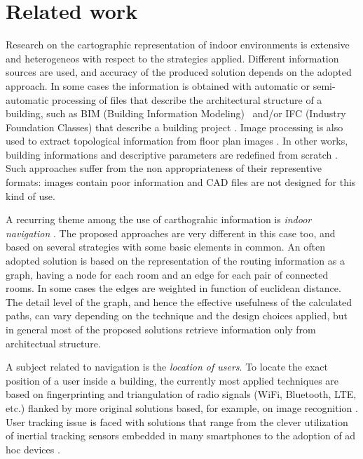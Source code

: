 \section{Related work}\label{related-work}

Research on the cartographic representation of indoor environments is
extensive and heterogeneos with respect to the strategies
applied. Different information sources are used, and accuracy of the
produced solution depends on the adopted approach. In some cases the
information is obtained with automatic or semi-automatic processing of files
that describe the architectural structure of a building, such as BIM (Building Information Modeling)~\cite{Eastman:2008:BHG:1796500} and/or IFC (Industry Foundation Classes) that describe a building project \cite{6816739}. Image processing is also used to
extract topological information from floor plan images \cite{6878152}. In
other works, building informations and descriptive parameters are redefined
from scratch \cite{6418876}. Such approaches suffer from the non appropriateness of
their representive formats: images contain poor information and CAD
files are not designed for this kind of use. 

A recurring theme among the use
of carthograhic information is \emph{indoor navigation}
\cite{6878152,6418876,6816739}. The proposed approaches are very different in
this case too, and based on several strategies with some basic elements in
common. An often adopted solution is based on the representation of the
routing information as a graph, having a node for each room and an edge for
each pair of connected rooms. In some cases the edges are weighted in
function of euclidean distance. The detail level of the graph, and hence the
effective usefulness of the calculated paths, can vary depending on the
technique and the design choices applied, but in general most of the proposed
solutions retrieve information only from architectual structure. 

A subject related to navigation is the \emph{location of users}. To locate the exact position of a user inside a
building, the currently most applied techniques are based on fingerprinting and
triangulation of radio signals (WiFi, Bluetooth, LTE, etc.) flanked by more
original solutions based, for example, on image recognition \cite{6815564}.
User tracking issue is faced with solutions that range from the clever
utilization of inertial tracking sensors embedded in many smartphones
\cite{6815564} to the adoption of ad hoc devices \cite{6878152}.

